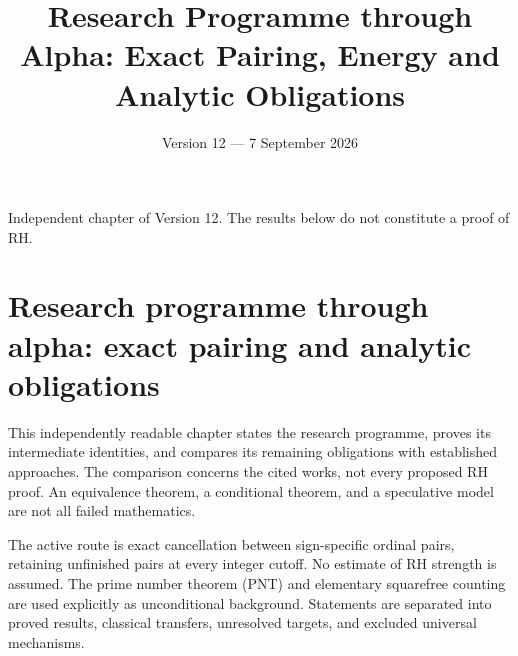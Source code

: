 \documentclass[11pt]{amsart}
\title[Research programme through alpha]{Research Programme through Alpha: Exact Pairing, Energy and Analytic Obligations}
\author{}
\date{Version 12 --- 7 September 2026}
\numberwithin{equation}{section}
\theoremstyle{plain}
\theoremstyle{definition}
\theoremstyle{remark}
\begin{document}
\maketitle
Independent chapter of Version 12. The results below do not constitute a proof of RH.

\setcounter{tocdepth}{2}
\tableofcontents
\clearpage

\section{Research programme through alpha: exact pairing and analytic obligations}
\label{sec:alpha-programme}

This independently readable chapter states the research programme, proves
its intermediate identities, and compares its remaining obligations with
established approaches. The comparison concerns the cited works, not every
proposed RH proof. An equivalence theorem, a conditional theorem, and a
speculative model are not all failed mathematics.

The active route is exact cancellation between sign-specific ordinal pairs,
retaining unfinished pairs at every integer cutoff. No estimate of RH
strength is assumed. The prime number theorem (PNT) and elementary squarefree
counting are used explicitly as unconditional background. Statements are
separated into proved results, classical transfers, unresolved targets,
and excluded universal mechanisms.
\end{document}
